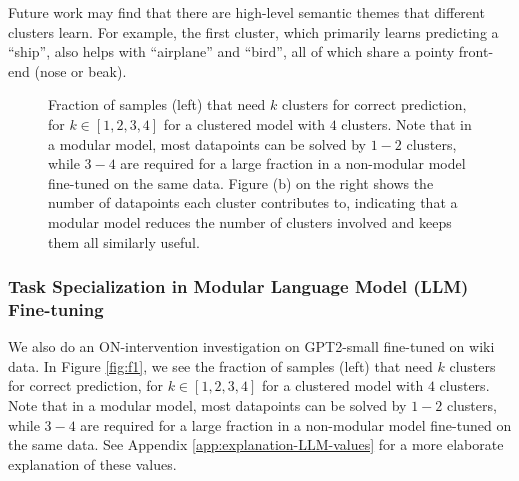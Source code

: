 

Future work may find that there are high-level semantic themes that different clusters learn. 
For example, the first cluster, which primarily learns predicting a ``ship'', also helps with ``airplane'' and ``bird'', all of which share a pointy front-end (nose or beak).

\begin{figure*}[t]
  \centering
  \hspace{0.02\linewidth}
  \caption{Fraction of samples (left) that need $k$ clusters for correct prediction, for $k\in[1,2,3,4]$ for a clustered model with $4$ clusters. Note that in a modular model, most datapoints can be solved by $1-2$ clusters, while $3-4$ are required for a large fraction in a non-modular model fine-tuned on the same data. Figure (b) on the right shows the number of datapoints each cluster contributes to, indicating that a modular model reduces the number of clusters involved and keeps them all similarly useful.}
  \label{fig:llm-fractions}
\end{figure*}

\subsubsection{Task Specialization in Modular Language Model (LLM) Fine-tuning}
\label{sec:modular-llm}

We also do an ON-intervention investigation on GPT2-small fine-tuned on wiki data.
In Figure \ref{fig:f1}, we see the fraction of samples (left) that need $k$ clusters for correct prediction, for $k\in[1,2,3,4]$ for a clustered model with $4$ clusters. 
Note that in a modular model, most datapoints can be solved by $1-2$ clusters, while $3-4$ are required for a large fraction in a non-modular model fine-tuned on the same data. 
See Appendix \ref{app:explanation-LLM-values} for a more elaborate explanation of these values.

